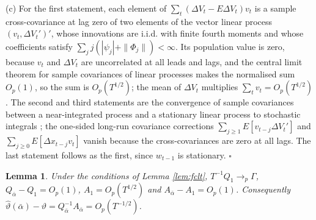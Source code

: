 \documentclass[12pt,a4paper]{article}
\newtheorem{lem}{Lemma}
\theoremstyle{definition}
\theoremstyle{definition}\newtheorem{example}{Example}
\theoremstyle{definition}\newtheorem{definition}{Definition}
\begin{document}
(c) For the first statement, each element of $\sum_t(\Delta V_t-E\Delta V_t)v_t$ is a sample cross-covariance at lag zero of two elements of the vector linear process $(v_t,\Delta V_t')'$, whose innovations are i.i.d. with finite fourth moments and whose coefficients satisfy $\sum_jj(|\psi_j|+\|\Phi_j\|)<\infty$. Its population value is zero, because $v_t$ and $\Delta V_t$ are uncorrelated at all leads and lags, and the central limit theorem for sample covariances of linear processes \citep[Theorem 3.8, Remark 3.9(i) and Section 4(i)]{PhillipsSolo1992} makes the normalised sum $O_p(1)$, so the sum is $O_p(T^{1/2})$; the mean of $\Delta V_t$ multiplies $\sum_tv_t=O_p(T^{1/2})$. The second and third statements are the convergence of sample covariances between a near-integrated process and a stationary linear process to stochastic integrals \citep{Phillips1987,Phillips1988}; the one-sided long-run covariance corrections $\sum_{j\geq1}E[v_{t-j}\Delta V_t']$ and $\sum_{j\geq0}E[\Delta x_{t-j}v_t]$ vanish because the cross-covariances are zero at all lags. The last statement follows as the first, since $w_{t-1}$ is stationary. $\square$

\begin{lem}\label{lem:orders}
Under the conditions of Lemma \ref{lem:fclt}, $T^{-1}Q_1\to_p\Gamma$, $Q_{\bar\alpha}-Q_1=O_p(1)$, $A_1=O_p(T^{1/2})$ and $A_{\bar\alpha}-A_1=O_p(1)$. Consequently $\hat\vartheta(\bar\alpha)-\vartheta=Q_{\bar\alpha}^{-1}A_{\bar\alpha}=O_p(T^{-1/2})$.
\end{lem}
\end{document}
